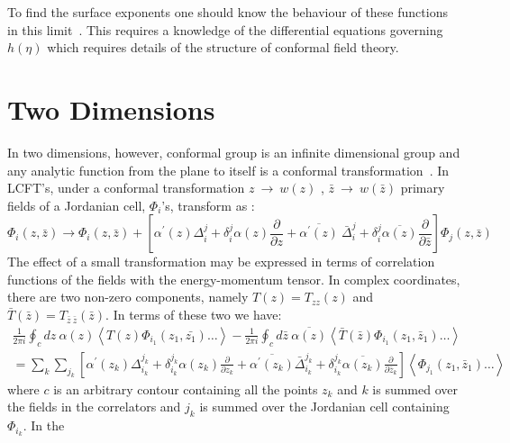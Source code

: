 To find the surface exponents one should know the behaviour of these functions in this limit~. 
This requires a knowledge of the differential equations governing $h(\eta)$
which requires details of the structure of conformal field theory. 

\section{Two Dimensions}

In two dimensions, however, conformal group is an infinite dimensional group
and any analytic function from the plane to itself is a conformal transformation~.
In LCFT's, under a conformal transformation $z\:\rightarrow\:w(z)$ , $ \bar{z}\:\rightarrow\:w(\bar{z})$
primary fields of a Jordanian cell, $\Phi_{i}$'s, transform as \cite{RAK}:
\begin{equation}
\Phi_{i}(z,\bar{z})\rightarrow \Phi_{i}(z,\bar{z})+\left[\alpha^{\prime}(z)
\Delta_{i}^{j}+\delta_{i}^{j}\alpha(z)\frac {\partial}{\partial{z}}+
\overline{\alpha^{\prime}(z)}\:
{\bar{\Delta}}_{i}^{j}+\delta_{i}^{j}\overline{\alpha(z)}
\frac{\partial}{\partial{\bar{z}}}\right]
\Phi_{j}(z,\bar{z})
\end{equation}
The effect of a small transformation may be expressed in terms of correlation functions
of the fields with the energy-momentum tensor.
In complex coordinates, there are two non-zero components, namely $T(z)=T_{zz}(z)$
and $\bar{T}(\bar{z})=T_{\bar{z}\:\bar{z}}(\bar{z})$.
In terms of these two we have:
\begin{eqnarray}
\frac 1{2\pi i}\oint_{c}dz\:\alpha(z)\left<T(z)\Phi_{i_{1}}(z_{1},\bar{z_{1}})\ldots\right>
-\frac 1{2\pi i} \oint_{c}d\bar{z}\:\overline{\alpha(z)}\left<\bar{T}
(\bar{z})\Phi_{i_{1}}(z_{1},{\bar{z}}_{1})\ldots\right>\nonumber\\
=\sum_{k}\sum_{j_{k}}\left[\alpha^{\prime}(z_{k})
\Delta^{j_{k}}_{i_{k}}+\delta^{j_{k}}_{i_{k}}\alpha(z_{k})\frac {\partial}{\partial{z_{k}}}+
\overline{\alpha^{\prime}(z_{k})}{\bar{\Delta}}^{j_{k}}_{i_{k}}
+\delta^{j_{k}}_{i_{k}}\overline{\alpha(z_{k})}
\frac {\partial}{\partial{\bar{z}}_{k}}\right]
\left<\Phi_{j_{1}}(z_{1},{\bar{z}}_{1})\ldots\right>
\end{eqnarray}
where $c$ is an arbitrary contour containing all the points $z_{k}$ and $k$ is
summed over the fields in the correlators and $j_{k}$ is summed over the
Jordanian cell containing $\Phi_{i_{k}}$. In the
